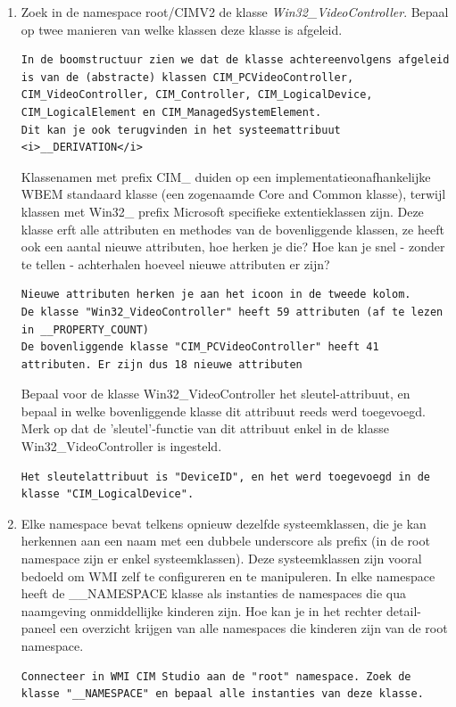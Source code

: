 \documentclass[11pt,a4paper]{report}
\begin{document}
\newpage
\begin{enumerate}[resume]
	\item Zoek in de namespace root/CIMV2 de klasse \textit{Win32\_VideoController}. Bepaal op twee manieren van welke klassen deze klasse is afgeleid.
\begin{lstlisting}
In de boomstructuur zien we dat de klasse achtereenvolgens afgeleid is van de (abstracte) klassen CIM_PCVideoController, CIM_VideoController, CIM_Controller, CIM_LogicalDevice, CIM_LogicalElement en CIM_ManagedSystemElement.
Dit kan je ook terugvinden in het systeemattribuut <i>__DERIVATION</i>
\end{lstlisting}
	Klassenamen met prefix CIM\_ duiden op een implementatieonafhankelijke WBEM standaard klasse (een zogenaamde Core and Common klasse), terwijl klassen met Win32\_ prefix Microsoft specifieke extentieklassen zijn.
	Deze klasse erft alle attributen en methodes van de bovenliggende klassen, ze heeft ook een aantal nieuwe attributen, hoe herken je die? Hoe kan je snel - zonder te tellen - achterhalen hoeveel nieuwe attributen er zijn?
\begin{lstlisting}
Nieuwe attributen herken je aan het icoon in de tweede kolom.
De klasse "Win32_VideoController" heeft 59 attributen (af te lezen in __PROPERTY_COUNT)
De bovenliggende klasse "CIM_PCVideoController" heeft 41 attributen. Er zijn dus 18 nieuwe attributen
\end{lstlisting}
	Bepaal voor de klasse Win32\_VideoController het sleutel-attribuut, en bepaal in welke bovenliggende klasse dit attribuut reeds werd toegevoegd. Merk op dat de 'sleutel'-functie van dit attribuut enkel in de klasse Win32\_VideoController is ingesteld.
\begin{lstlisting}
Het sleutelattribuut is "DeviceID", en het werd toegevoegd in de klasse "CIM_LogicalDevice".
\end{lstlisting}
	\item Elke namespace bevat telkens opnieuw dezelfde systeemklassen, die je kan herkennen aan een naam met een dubbele underscore als prefix (in de root namespace zijn er enkel systeemklassen). Deze systeemklassen zijn vooral bedoeld om WMI zelf te configureren en te manipuleren. In elke namespace heeft de \_\_NAMESPACE klasse als instanties de namespaces die qua naamgeving onmiddellijke kinderen zijn.
	Hoe kan je in het rechter detail-paneel een overzicht krijgen van alle namespaces die kinderen zijn van de root namespace.
\begin{lstlisting}
Connecteer in WMI CIM Studio aan de "root" namespace. Zoek de klasse "__NAMESPACE" en bepaal alle instanties van deze klasse.


\end{lstlisting}
\end{enumerate}
\end{document}
